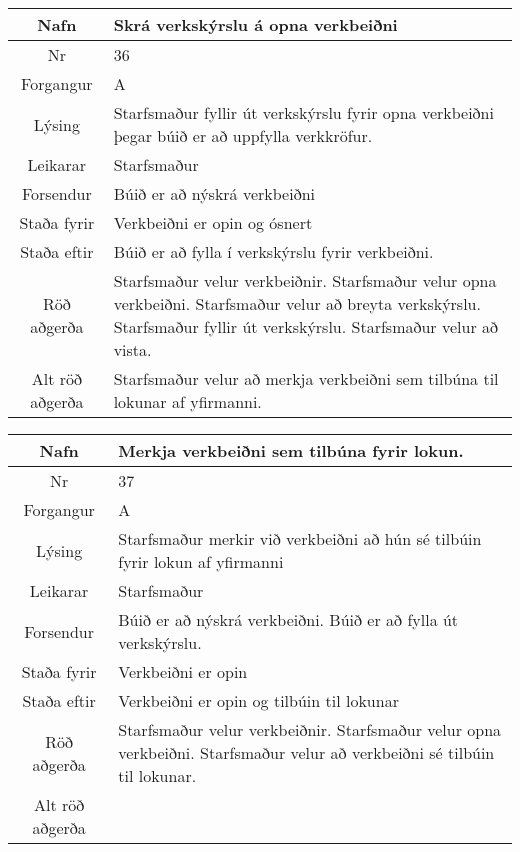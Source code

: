 \begin{table}[h!]\centering
\begin{tabular}{|c|p{10cm}|}
\hline
Nafn&Skrá verkskýrslu á opna verkbeiðni\\
\hline
Nr&36\\
\hline
Forgangur&A\\
\hline
Lýsing&Starfsmaður fyllir út verkskýrslu fyrir opna verkbeiðni þegar búið er að uppfylla verkkröfur.\\
\hline
Leikarar&Starfsmaður\\
\hline
Forsendur&Búið er að nýskrá verkbeiðni\\
\hline
Staða fyrir&Verkbeiðni er opin og ósnert\\
\hline
Staða eftir&Búið er að fylla í verkskýrslu fyrir verkbeiðni.\\
\hline
Röð aðgerða&Starfsmaður velur verkbeiðnir. Starfsmaður velur opna verkbeiðni. Starfsmaður velur að breyta verkskýrslu. Starfsmaður fyllir út verkskýrslu. Starfsmaður velur að vista.\\
\hline
Alt röð aðgerða&Starfsmaður velur að merkja verkbeiðni sem tilbúna til lokunar af yfirmanni.\\
\hline
\end{tabular}
\end{table}
\caption{Use case 36}\label{tab:use_case_36}
\begin{table}[h!]\centering
\begin{tabular}{|c|p{10cm}|}
\hline
Nafn&Merkja verkbeiðni sem tilbúna fyrir lokun.\\
\hline
Nr&37\\
\hline
Forgangur&A\\
\hline
Lýsing&Starfsmaður merkir við verkbeiðni að hún sé tilbúin fyrir lokun af yfirmanni\\
\hline
Leikarar&Starfsmaður\\
\hline
Forsendur&Búið er að nýskrá verkbeiðni. Búið er að fylla út verkskýrslu.\\
\hline
Staða fyrir&Verkbeiðni er opin\\
\hline
Staða eftir&Verkbeiðni er opin og tilbúin til lokunar\\
\hline
Röð aðgerða&Starfsmaður velur verkbeiðnir. Starfsmaður velur opna verkbeiðni. Starfsmaður velur að verkbeiðni sé tilbúin til lokunar.\\
\hline
Alt röð aðgerða&\\
\hline
\end{tabular}
\end{table}
